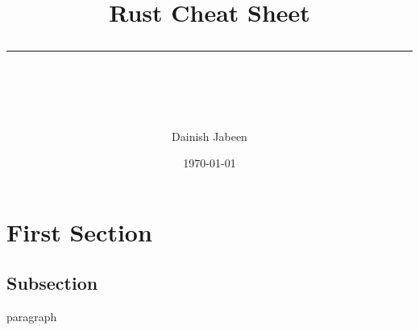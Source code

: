 \documentclass[11pt]{scrartcl} %
\title{	
	\normalfont\normalsize
	\vspace{20pt} %
	{\huge Rust Cheat Sheet}\\ %
	\vspace{12pt} %
	\rule{\linewidth}{2pt}\\ %
}
\author{\small Dainish Jabeen} %
\date{\normalsize\today} %
\begin{document}
\maketitle %

\section{First Section}

\subsection{Subsection}

paragraph





\end{document}
